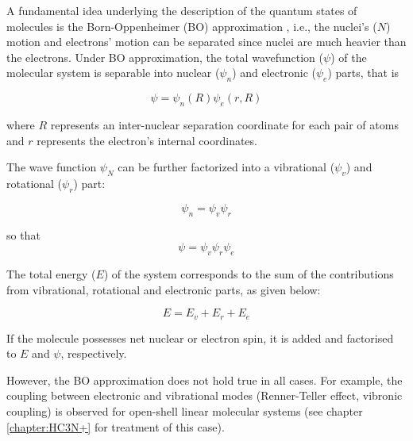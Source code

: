 A fundamental idea underlying the description of the quantum states of
molecules is the Born-Oppenheimer (BO) approximation \cite{born_zur_1927},
i.e., the nuclei's ($N$) motion and electrons' motion can be separated since
nuclei are much heavier than the electrons. Under BO approximation, the total
wavefunction ($\psi$) of the molecular system is separable into nuclear
($\psi_n$) and electronic ($\psi_e$) parts, that is

\begin{equation*}
    \psi = \psi_n (R) \psi_{e}(r, R)
\end{equation*}

where $R$ represents an inter-nuclear separation coordinate for each pair of
atoms and $r$ represents the electron's internal coordinates.

The wave function $\psi_N$ can be further factorized into a vibrational
($\psi_v$) and rotational ($\psi_r$) part:

\begin{equation*}
    \psi_n = \psi_v \psi_{r}
\end{equation*}

so that
\[ \psi = \psi_v \psi_{r} \psi_{e} \]

The total energy ($E$) of the system corresponds to the sum of the
contributions from vibrational, rotational and electronic parts, as given
below:

\begin{equation*}
    E =  E_{v} + E_{r} + E_{e}
\end{equation*}

If the molecule possesses net nuclear or electron spin, it is added and
factorised to $E$ and $\psi$, respectively.

However, the BO approximation does not hold true in all cases. For example, the
coupling between electronic and vibrational modes (Renner-Teller effect,
vibronic coupling) is observed for open-shell linear molecular systems (see
chapter \ref{chapter:HC3N+} for treatment of this case).


